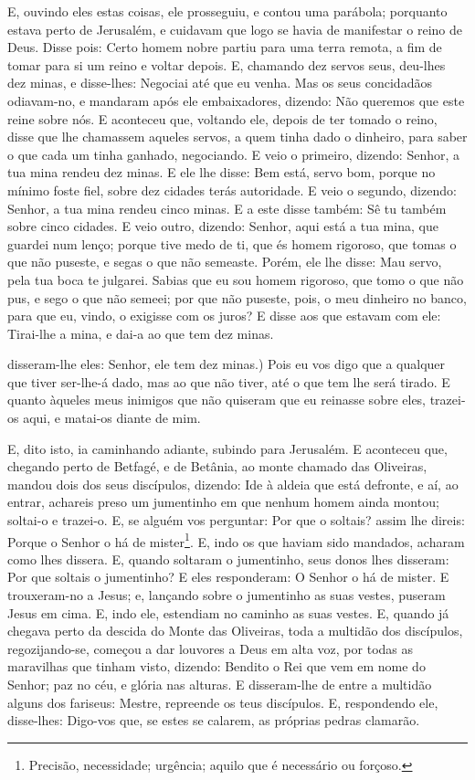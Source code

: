 E, ouvindo eles estas coisas, ele prosseguiu, e contou uma
parábola; porquanto estava perto de Jerusalém, e cuidavam que logo
se havia de manifestar o reino de Deus. Disse pois: Certo
homem nobre partiu para uma terra remota, a fim de tomar para si um
reino e voltar depois. E, chamando dez servos seus, deu-lhes
dez minas, e disse-lhes: Negociai até que eu venha. Mas os
seus concidadãos odiavam-no, e mandaram após ele embaixadores,
dizendo: Não queremos que este reine sobre nós. E aconteceu
que, voltando ele, depois de ter tomado o reino, disse que lhe
chamassem aqueles servos, a quem tinha dado o dinheiro, para saber o
que cada um tinha ganhado, negociando. E veio o primeiro,
dizendo: Senhor, a tua mina rendeu dez minas. E ele lhe
disse: Bem está, servo bom, porque no mínimo foste fiel, sobre dez
cidades terás autoridade. E veio o segundo, dizendo: Senhor,
a tua mina rendeu cinco minas. E a este disse também: Sê tu
também sobre cinco cidades. E veio outro, dizendo: Senhor,
aqui está a tua mina, que guardei num lenço; porque tive medo
de ti, que és homem rigoroso, que tomas o que não puseste, e segas o
que não semeaste. Porém, ele lhe disse: Mau servo, pela tua
boca te julgarei. Sabias que eu sou homem rigoroso, que tomo o que
não pus, e sego o que não semeei; por que não puseste, pois,
o meu dinheiro no banco, para que eu, vindo, o exigisse com os
juros? E disse aos que estavam com ele: Tirai-lhe a mina, e
dai-a ao que tem dez minas.

disseram-lhe eles: Senhor, ele tem dez minas.) Pois eu
vos digo que a qualquer que tiver ser-lhe-á dado, mas ao que não
tiver, até o que tem lhe será tirado. E quanto àqueles meus
inimigos que não quiseram que eu reinasse sobre eles, trazei-os
aqui, e matai-os diante de mim.

E, dito isto, ia caminhando adiante, subindo para Jerusalém.
E aconteceu que, chegando perto de Betfagé, e de Betânia, ao
monte chamado das Oliveiras, mandou dois dos seus discípulos,
dizendo: Ide à aldeia que está defronte, e aí, ao entrar,
achareis preso um jumentinho em que nenhum homem ainda montou;
soltai-o e trazei-o. E, se alguém vos perguntar: Por que o
soltais? assim lhe direis: Porque o Senhor o há de
mister\footnote{Precisão, necessidade; urgência; aquilo que é
necessário ou forçoso.}. E, indo os que haviam sido mandados,
acharam como lhes dissera. E, quando soltaram o jumentinho,
seus donos lhes disseram: Por que soltais o jumentinho? E
eles responderam: O Senhor o há de mister. E trouxeram-no a
Jesus; e, lançando sobre o jumentinho as suas vestes, puseram Jesus
em cima. E, indo ele, estendiam no caminho as suas vestes.
E, quando já chegava perto da descida do Monte das Oliveiras,
toda a multidão dos discípulos, regozijando-se, começou a dar
louvores a Deus em alta voz, por todas as maravilhas que tinham
visto, dizendo: Bendito o Rei que vem em nome do Senhor; paz
no céu, e glória nas alturas. E disseram-lhe de entre a
multidão alguns dos fariseus: Mestre, repreende os teus discípulos.
E, respondendo ele, disse-lhes: Digo-vos que, se estes se
calarem, as próprias pedras clamarão.

